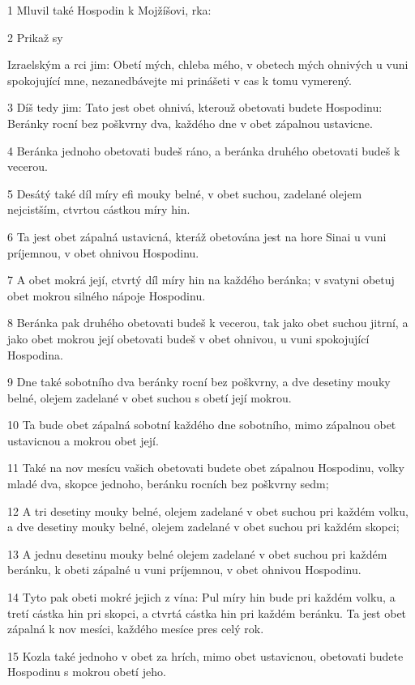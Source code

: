 \par 1 Mluvil také Hospodin k Mojžíšovi, rka:
\par 2 Prikaž sy\par Izraelským a rci jim: Obetí mých, chleba mého, v obetech mých ohnivých u vuni spokojující mne, nezanedbávejte mi prinášeti v cas k tomu vymerený.
\par 3 Díš tedy jim: Tato jest obet ohnivá, kterouž obetovati budete Hospodinu: Beránky rocní bez poškvrny dva, každého dne v obet zápalnou ustavicne.
\par 4 Beránka jednoho obetovati budeš ráno, a beránka druhého obetovati budeš k vecerou.
\par 5 Desátý také díl míry efi mouky belné, v obet suchou, zadelané olejem nejcistším, ctvrtou cástkou míry hin.
\par 6 Ta jest obet zápalná ustavicná, kteráž obetována jest na hore Sinai u vuni príjemnou, v obet ohnivou Hospodinu.
\par 7 A obet mokrá její, ctvrtý díl míry hin na každého beránka; v svatyni obetuj obet mokrou silného nápoje Hospodinu.
\par 8 Beránka pak druhého obetovati budeš k vecerou, tak jako obet suchou jitrní, a jako obet mokrou její obetovati budeš v obet ohnivou, u vuni spokojující Hospodina.
\par 9 Dne také sobotního dva beránky rocní bez poškvrny, a dve desetiny mouky belné, olejem zadelané v obet suchou s obetí její mokrou.
\par 10 Ta bude obet zápalná sobotní každého dne sobotního, mimo zápalnou obet ustavicnou a mokrou obet její.
\par 11 Také na nov mesícu vašich obetovati budete obet zápalnou Hospodinu, volky mladé dva, skopce jednoho, beránku rocních bez poškvrny sedm;
\par 12 A tri desetiny mouky belné, olejem zadelané v obet suchou pri každém volku, a dve desetiny mouky belné, olejem zadelané v obet suchou pri každém skopci;
\par 13 A jednu desetinu mouky belné olejem zadelané v obet suchou pri každém beránku, k obeti zápalné u vuni príjemnou, v obet ohnivou Hospodinu.
\par 14 Tyto pak obeti mokré jejich z vína: Pul míry hin bude pri každém volku, a tretí cástka hin pri skopci, a ctvrtá cástka hin pri každém beránku. Ta jest obet zápalná k nov mesíci, každého mesíce pres celý rok.
\par 15 Kozla také jednoho v obet za hrích, mimo obet ustavicnou, obetovati budete Hospodinu s mokrou obetí jeho.
